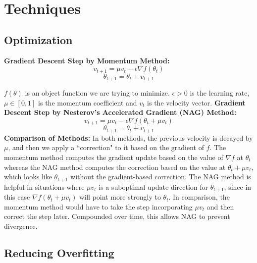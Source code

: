 \documentclass[a4paper]{article}
\begin{document}
\section{Techniques}
\subsection{Optimization}

\textbf{Gradient Descent Step by Momentum Method:}
$$v_{t+1} = \mu v_t - \epsilon \nabla f(\theta_t) $$
$$\theta_{t+1} = \theta_t + v_{t+1}$$

$f(\theta)$ is an object function we are trying to minimize. $\epsilon > 0$ is the learning rate, $\mu \in [0,1]$ is the momentum coefficient and $v_t$ is the velocity vector.  
\newline
\newline
\textbf{Gradient Descent Step by Nesterov's Accelerated Gradient (NAG) Method:}
$$v_{t+1} = \mu v_t - \epsilon \nabla f(\theta_t + \mu v_t) $$
$$\theta_{t+1} = \theta_t + v_{t+1}$$
\textbf{Comparison of Methods:}
\newline
\newline
In both methods, the previous velocity is decayed by $\mu$, and then we apply a ``correction" to it based on the gradient of $f$. The momentum method computes the gradient update based on the value of $\nabla f$ at $\theta_t$ whereas the NAG method computes the correction based on the value at $\theta_t + \mu v_t$, which looks like $\theta_{t+1}$ without the gradient-based correction. The NAG method is helpful in situations where $\mu v_t$ is a suboptimal update direction for $\theta_{t+1}$, since in this case $\nabla f(\theta_t + \mu v_t) $ will point more strongly to $\theta_t$. In comparison, the momentum method would have to take the step incorporating $\mu v_t$ and then correct the step later. Compounded over time, this allows NAG to prevent divergence.

\subsection{Reducing Overfitting}
\end{document}
